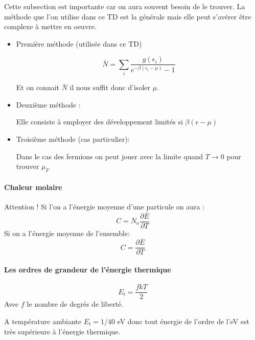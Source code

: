 Cette subsection est importante car on aura souvent besoin de le trouver. La méthode que l'on utilise dans ce TD est la générale mais elle peut s'avérer être complexe à mettre en oeuvre.

\begin{itemize}[label=]

	\item Première méthode (utilisée dans ce TD)

	\[
		\bar{N}=\sum_i \frac{g(\epsilon_i)}{e^{-\beta (\epsilon_i-\mu)}-1}
	\]

	Et on connait $\bar{N}$ il nous suffit donc d'isoler $\mu$.

	\item Deuxième méthode :

	Elle consiste à employer des développement limités si $\beta (\epsilon-\mu)$

	\item Troisième méthode (cas particulier): 

	Dans le cas des fermions on peut jouer avec la limite quand $T\rightarrow 0$ pour trouver $\mu_F$

\end{itemize}


\paragraph{Chaleur molaire}

Attention ! Si l'on a l'énergie moyenne d'une particule on aura :
\[
	 C=N_a \frac{\partial \bar{E}}{\partial T}
\]
Si on a l'énergie moyenne de l'ensemble:
\[
	 C= \frac{\partial \bar{E}}{\partial T}
\]


\paragraph{Les ordres de grandeur de l'énergie thermique}

\[
	E_t=\frac{fkT}{2}
\] 
Avec $f$ le nombre de degrés de liberté.

A température ambiante $E_t=1/40$ eV donc tout énergie de l'ordre de l'eV est très supérieure à l'énergie thermique.